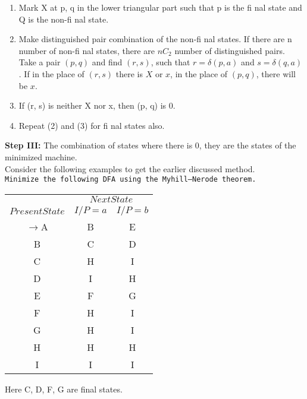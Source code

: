 \documentclass{article}
\begin{document}
\small{
\begin{enumerate}
  \item Mark X at p, q in the lower triangular part such that p is the fi nal state and Q is the non-fi nal state.\\
  \item Make distinguished pair combination of the non-fi nal states. If there are n number of non-fi nal
states, there are $nC_2$ number of distinguished pairs.\\
Take a pair $(p, q)$ and find $(r, s)$, such that $r = \delta(p, a)$ and $s = \delta(q, a)$. If in the place of $(r, s)$ there
is $X$ or $x$, in the place of $(p, q)$, there will be $x$.\\
  \item If (r, s) is neither X nor x, then (p, q) is 0.\\
  \item Repeat (2) and (3) for fi nal states also.\\
\end{enumerate}
}
\vspace*{0.1cm}
\textbf{Step III:} The combination of states where there is 0, they are the states of the minimized machine.\\

\vspace*{0.1cm}
Consider the following examples to get the earlier discussed method.\\

\vspace*{0.1cm}
 \hspace*{0.1cm} \texttt{Minimize the following DFA using the Myhill–Nerode theorem.}


\small{
\begin{center}
\begin{tabular}{ccc}
 \hline

 \hline

 \hline

 \hline
 & \multicolumn{2}{c}{$Next State$}\\
 \cline{2-3}
 $Present State$ &  $I/P=a$ & $I/P=b$\\
\hline
$\rightarrow$A& B& E \\
           B &C& D \\
           C &H& I \\
           D &I& H \\
           E &F& G \\
           F &H& I \\
           G &H& I \\
           H &H& H \\
           I &I& I \\
 \hline

 \hline

 \hline

 \hline
\end{tabular}
\end{center}
Here C, D, F, G are final states.\\
}
\end{document}

